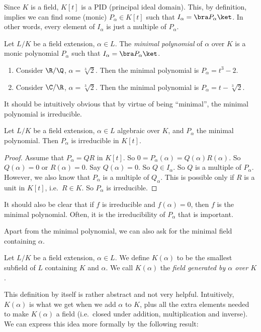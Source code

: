 \documentclass[a4paper]{article}
\begin{document}
Since $K$ is a field, $K[t]$ is a PID (principal ideal domain). This, by definition, implies we can find some (monic) $P_\alpha \in K[t]$ such that $I_\alpha = \bra P_\alpha\ket$. In other words, every element of $I_\alpha$ is just a multiple of $P_\alpha$.
\begin{defi}
  Let $L/K$ be a field extension, $\alpha \in L$. The \emph{minimal polynomial} of $\alpha$ over $K$ is a monic polynomial $P_\alpha$ such that $I_\alpha = \bra P_\alpha\ket$.
\end{defi}

\begin{eg}\leavevmode
  \begin{enumerate}
    \item Consider $\R/\Q$, $\alpha = \sqrt[3]{2}$. Then the minimal polynomial is $P_\alpha = t^3 - 2$.
    \item Consider $\C/\R$, $\alpha = \sqrt[3]{2}$. Then the minimal polynomial is $P_\alpha = t - \sqrt[3]{2}$.
  \end{enumerate}
\end{eg}

It should be intuitively obvious that by virtue of being ``minimal'', the minimal polynomial is irreducible.
\begin{prop}
  Let $L/K$ be a field extension, $\alpha\in L$ algebraic over $K$, and $P_\alpha$ the minimal polynomial. Then $P_\alpha$ is irreducible in $K[t]$.
\end{prop}

\begin{proof}
  Assume that $P_\alpha = QR$ in $K[t]$. So $0 = P_\alpha(\alpha) = Q(\alpha) R(\alpha)$. So $Q(\alpha) = 0$ or $R(\alpha) = 0$. Say $Q(\alpha) = 0$. So $Q\in I_\alpha$. So $Q$ is a multiple of $P_\alpha$. However, we also know that $P_\alpha$ is a multiple of $Q_\alpha$. This is possible only if $R$ is a unit in $K[t]$, i.e.\ $R\in K$. So $P_\alpha$ is irreducible.
\end{proof}
It should also be clear that if $f$ is irreducible and $f(\alpha) = 0$, then $f$ is the minimal polynomial. Often, it is the irreducibility of $P_\alpha$ that is important.

Apart from the minimal polynomial, we can also ask for the minimal field containing $\alpha$.
\begin{defi}
  Let $L/K$ be a field extension, $\alpha\in L$. We define $K(\alpha)$ to be the smallest subfield of $L$ containing $K$ and $\alpha$. We call $K(\alpha)$ the \emph{field generated by $\alpha$ over $K$}.
\end{defi}
This definition by itself is rather abstract and not very helpful. Intuitively, $K(\alpha)$ is what we get when we add $\alpha$ to $K$, plus all the extra elements needed to make $K(\alpha)$ a field (i.e.\ closed under addition, multiplication and inverse). We can express this idea more formally by the following result:
\end{document}
